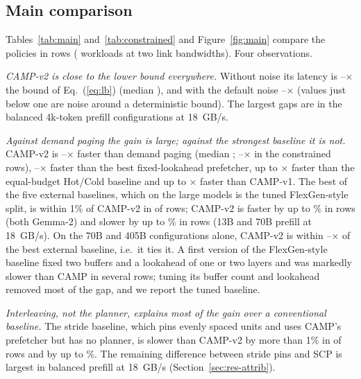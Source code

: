 \documentclass[preprint,12pt]{elsarticle}
\newcommand{\camp}{\textsc{CAMP}}
\begin{document}
\subsection{Main comparison}
\label{sec:res-main}

Tables~\ref{tab:main} and~\ref{tab:constrained} and Figure~\ref{fig:main} compare the policies in \nMainRows{} rows (\nMainConfigs{} workloads at two link bandwidths). Four observations.

\emph{\camp-v2 is close to the lower bound everywhere.} Without noise its latency is \nDetLbMin--\nDetLbMax$\times$ the bound of Eq.~(\ref{eq:lb}) (median \nDetLbMed), and with the default noise \nNoisyLbMin--\nNoisyLbMax$\times$ (values just below one are noise around a deterministic bound). The largest gaps are in the balanced 4k-token prefill configurations at 18~GB/s.

\emph{Against demand paging the gain is large; against the strongest baseline it is not.} \camp-v2 is \nDemOverCampMin--\nDemOverCampMax$\times$ faster than demand paging (median \nDemOverCampMed; \nConstrainedDemOverCampMin--\nConstrainedDemOverCampMax$\times$ in the constrained rows), \nSkOverCampMin--\nSkOverCampMax$\times$ faster than the best fixed-lookahead prefetcher, up to \nHcOverCampMax$\times$ faster than the equal-budget Hot/Cold baseline and up to \nVOneOverCampMax$\times$ faster than \camp-v1. The best of the five external baselines, which on the large models is the tuned FlexGen-style split, is within 1\% of \camp-v2 in \nTieExt{} of \nMainRows{} rows; \camp-v2 is faster by up to \nExtOverCampMaxPct\% in \nWinExt{} rows (both Gemma-2) and slower by up to \nWorstLossExt\% in \nLoseExt{} rows (13B and 70B prefill at 18~GB/s). On the 70B and 405B configurations alone, \camp-v2 is within \nMainExtOverCampMin--\nMainExtOverCampMax$\times$ of the best external baseline, i.e.\ it ties it. A first version of the FlexGen-style baseline fixed two buffers and a lookahead of one or two layers and was markedly slower than \camp{} in several rows; tuning its buffer count and lookahead removed most of the gap, and we report the tuned baseline.

\emph{Interleaving, not the planner, explains most of the gain over a conventional baseline.} The stride baseline, which pins evenly spaced units and uses \camp's prefetcher but has no planner, is slower than \camp-v2 by more than 1\% in \nStLoses{} of \nMainRows{} rows and by up to \nStLoseMaxPct\%. The remaining difference between stride pins and SCP is largest in balanced prefill at 18~GB/s (Section~\ref{sec:res-attrib}).
\end{document}
